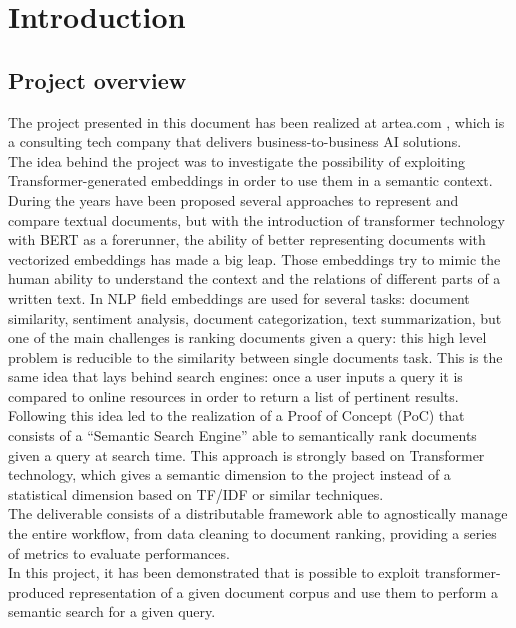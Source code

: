 \documentclass[\main/main.tex]{subfiles}
\begin{document}
\chapter*{Introduction}
\section*{Project overview}
The project presented in this document has been realized at artea.com \cite{artea}, which is a consulting tech company that delivers business-to-business AI solutions. \\
The idea behind the project was to investigate the possibility of exploiting Transformer-generated embeddings in order to use them in a semantic context. During the years have been proposed several approaches to represent and compare textual documents, but with the introduction of transformer technology with BERT as a forerunner, the ability of better representing documents with vectorized embeddings has made a big leap. Those embeddings try to mimic the human ability to understand the context and the relations of different parts of a written text. In NLP field embeddings are used for several tasks: document similarity, sentiment analysis, document categorization, text summarization, but one of the main challenges is ranking documents given a query: this high level problem is reducible to the similarity between single documents task. This is the same idea that lays behind search engines: once a user inputs a query it is compared to online resources in order to return a list of pertinent results. \\
Following this idea led to the realization of a  Proof of Concept (PoC) that consists of a ``Semantic Search Engine'' able to semantically rank documents given a query at search time. This approach is strongly based on Transformer technology, which gives a semantic dimension to the project instead of a statistical dimension based on TF/IDF or similar techniques. \\
The deliverable consists of a distributable framework able to agnostically manage the entire workflow, from data cleaning to document ranking, providing a series of metrics to evaluate performances. \\
In this project, it has been demonstrated that is possible to exploit transformer-produced representation of a given document corpus and use them to perform a semantic search for a given query.
\end{document}
